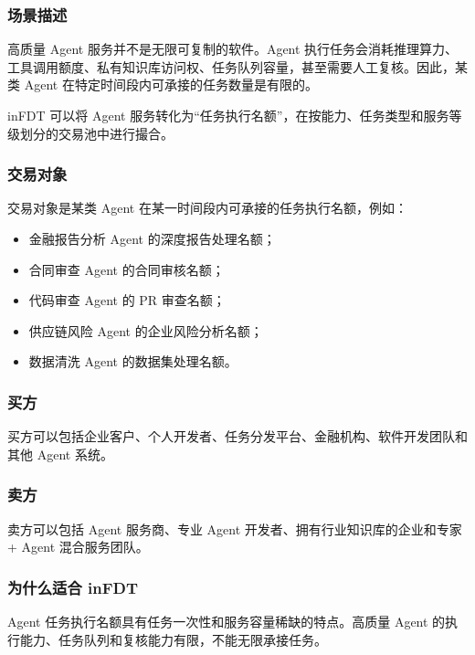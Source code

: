 \documentclass[UTF8,a4paper,12pt]{ctexart}
\begin{document}
\subsubsection*{场景描述}

高质量 Agent 服务并不是无限可复制的软件。Agent 执行任务会消耗推理算力、工具调用额度、私有知识库访问权、任务队列容量，甚至需要人工复核。因此，某类 Agent 在特定时间段内可承接的任务数量是有限的。

inFDT 可以将 Agent 服务转化为“任务执行名额”，在按能力、任务类型和服务等级划分的交易池中进行撮合。

\subsubsection*{交易对象}

交易对象是某类 Agent 在某一时间段内可承接的任务执行名额，例如：

\begin{itemize}
    \item 金融报告分析 Agent 的深度报告处理名额；
    \item 合同审查 Agent 的合同审核名额；
    \item 代码审查 Agent 的 PR 审查名额；
    \item 供应链风险 Agent 的企业风险分析名额；
    \item 数据清洗 Agent 的数据集处理名额。
\end{itemize}

\subsubsection*{买方}

买方可以包括企业客户、个人开发者、任务分发平台、金融机构、软件开发团队和其他 Agent 系统。

\subsubsection*{卖方}

卖方可以包括 Agent 服务商、专业 Agent 开发者、拥有行业知识库的企业和专家 + Agent 混合服务团队。

\subsubsection*{为什么适合 inFDT}

Agent 任务执行名额具有任务一次性和服务容量稀缺的特点。高质量 Agent 的执行能力、任务队列和复核能力有限，不能无限承接任务。
\end{document}
